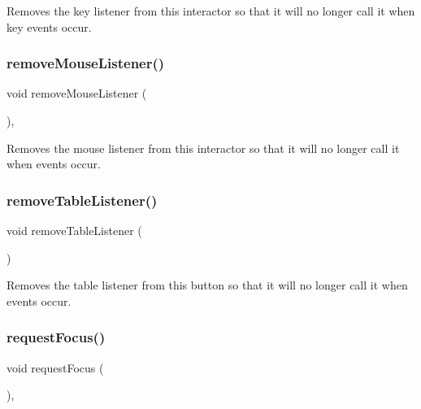Removes the key listener from this interactor so that it will no longer call it when key events occur. 

\mbox{\label{classsgl_1_1GInteractor_aff47f71ce47e688a07c9d38dc92fcc11}} 
\subsubsection{\texorpdfstring{remove\+Mouse\+Listener()}{removeMouseListener()}}
{\footnotesize\ttfamily void remove\+Mouse\+Listener (\begin{DoxyParamCaption}{ }\end{DoxyParamCaption})\hspace{0.3cm}{\ttfamily [virtual]}, {\ttfamily [inherited]}}



Removes the mouse listener from this interactor so that it will no longer call it when events occur. 

\mbox{\label{classsgl_1_1GTable_a5c18bacaf370f9c3da545f5c6e6e9515}} 
\subsubsection{\texorpdfstring{remove\+Table\+Listener()}{removeTableListener()}}
{\footnotesize\ttfamily void remove\+Table\+Listener (\begin{DoxyParamCaption}{ }\end{DoxyParamCaption})\hspace{0.3cm}{\ttfamily [virtual]}}



Removes the table listener from this button so that it will no longer call it when events occur. 

\mbox{\label{classsgl_1_1GTable_a5921efd0a5a83eacebdadb749fb3ea7a}} 
\subsubsection{\texorpdfstring{request\+Focus()}{requestFocus()}}
{\footnotesize\ttfamily void request\+Focus (\begin{DoxyParamCaption}{ }\end{DoxyParamCaption})\hspace{0.3cm}{\ttfamily [override]}, {\ttfamily [virtual]}}



